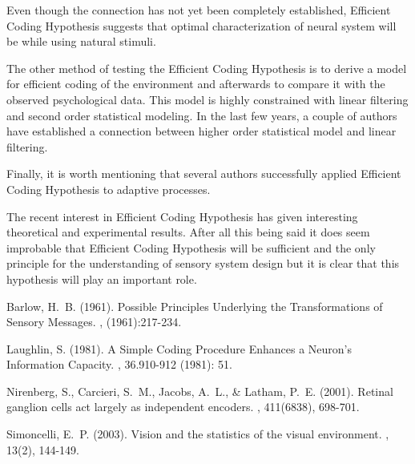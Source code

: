 \documentclass[twoside]{article}
\begin{document}
\begin{multicols}{2}
Even though the connection has not yet been completely established, Efficient Coding Hypothesis suggests that optimal characterization of neural system will be while using natural stimuli.

The other method of testing the Efficient Coding Hypothesis is to derive a model for efficient coding of the environment and afterwards to compare it with the observed psychological data. This model is highly constrained with linear filtering and second order statistical modeling. In the last few years, a couple of authors have established a connection between higher order statistical model and linear filtering.

Finally, it is worth mentioning that several authors successfully applied Efficient Coding Hypothesis to adaptive processes.

The recent interest in Efficient Coding Hypothesis has given interesting theoretical and experimental results. After all this being said it does seem improbable that Efficient Coding Hypothesis will be sufficient and the only principle for the understanding of sensory system design but it is clear that this hypothesis will play an important role.










\begin{thebibliography}{99} 

Barlow, H.~B. (1961).
\newblock Possible Principles Underlying the Transformations of Sensory Messages.
, (1961):217-234.

Laughlin, S. (1981).
\newblock A Simple Coding Procedure Enhances a Neuron's Information Capacity.
, 36.910-912 (1981): 51.

Nirenberg, S., Carcieri, S.~M., Jacobs, A.~L., \& Latham, P.~E. (2001).
\newblock Retinal ganglion cells act largely as independent encoders.
, 411(6838), 698-701.

Simoncelli, E.~P. (2003).
\newblock  Vision and the statistics of the visual environment.
, 13(2), 144-149.
 
\end{thebibliography}



\end{multicols}
\end{document}
